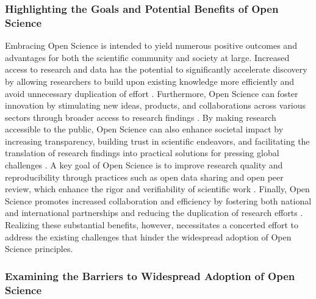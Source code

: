 \documentclass{article}
\begin{document}
\subsubsection{Highlighting the Goals and Potential Benefits of Open Science}

Embracing Open Science is intended to yield numerous positive outcomes and advantages for both the scientific community and society at large. Increased access to research and data has the potential to significantly accelerate discovery by allowing researchers to build upon existing knowledge more efficiently and avoid unnecessary duplication of effort \cite{fecher2014open}. Furthermore, Open Science can foster innovation by stimulating new ideas, products, and collaborations across various sectors through broader access to research findings \cite{bartling2014opening}. By making research accessible to the public, Open Science can also enhance societal impact by increasing transparency, building trust in scientific endeavors, and facilitating the translation of research findings into practical solutions for pressing global challenges \cite{fecher2014open}. A key goal of Open Science is to improve research quality and reproducibility through practices such as open data sharing and open peer review, which enhance the rigor and verifiability of scientific work \cite{simmons2011false}. Finally, Open Science promotes increased collaboration and efficiency by fostering both national and international partnerships and reducing the duplication of research efforts \cite{fecher2014open}. Realizing these substantial benefits, however, necessitates a concerted effort to address the existing challenges that hinder the widespread adoption of Open Science principles.

\subsubsection{Examining the Barriers to Widespread Adoption of Open Science}
\end{document}
